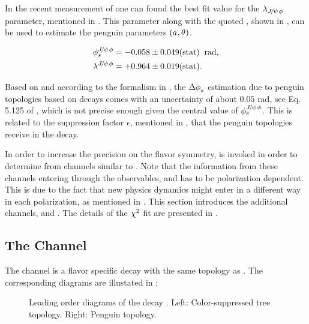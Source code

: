 In the recent \lhcb measurement \cite{phis-3fb-paper} of \phis one can found the best fit value for the $\lambda_{{J\mskip -3mu/\mskip -2mu\psi\mskip 2mu}\phi}$
parameter, mentioned in . This parameter along with the quoted \phis, shown in ,
can be used to estimate the penguin parameters $(a_{},\theta_{})$.

\begin{subequations}
  \label{phis_lambda_result}
  \begin{align}
    \centering
    \phis^{\jpsi\phi}     &=  -0.058 \pm 0.049(\text{stat})  \;\; \text{rad},\\
    \lambda^{\jpsi\phi}   &=  +0.964 \pm 0.019(\text{stat}).
  \end{align}
\end{subequations}

\noindent Based on  and according to the formalism in , the $\Delta\phi_{s}^{}$ estimation
due to penguin topologies based on \BsJpsiPhi decays comes with an uncertainty of about $0.05$ rad, see Eq. 5.125 of \cite{DeBruyn-thesis}, which is not precise
enough given the central value of $\phi_{s}^{{J\mskip -3mu/\mskip -2mu\psi\mskip 2mu}\phi}$. This is related to the suppression factor $\epsilon$, mentioned in
, that the penguin topologies receive in the \BsJpsiPhi decay.

In order to increase the precision on \DeltaPhis{} the \grpsuthree flavor symmetry,
is invoked in order to determine \DeltaPhis{} from channels similar to \BsJpsiPhi.
Note that the information from these channels entering through the observables,  and 
has to be polarization dependent. This is due to the fact that new physics dynamics might enter in a different way in each polarization,
as mentioned in \cite{DeBruyn-thesis}.
This section introduces the additional channels, \BsJpsiKst and \BdJpsiRho. The details of the $\chi^2$ fit are presented in .


\subsection{The \BsJpsiKst Channel}
\label{bsjpsikst_chanell}

The \BsJpsiKst channel is a flavor specific decay with the same topology as \BsJpsiPhi. The corresponding
diagrams are illustated in ;

\begin{figure}[h]
  \centering
  \scalebox{0.9}{\sffamily }
  \caption{Leading order diagrams of the decay \BsJpsiKst. Left: Color-suppressed tree topology. Right: Penguin topology.}
  \label{bs2jpsikst}
\end{figure}

